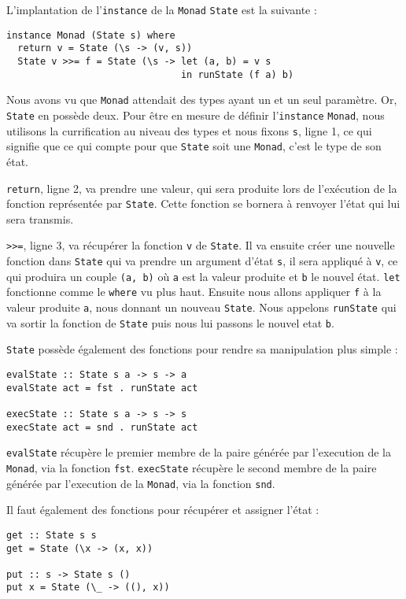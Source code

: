 \documentclass{llncs}
\begin{document}
L'implantation de l'\lstinline{instance} de la \lstinline{Monad} \lstinline{State}
est la suivante :
\begin{lstlisting}
instance Monad (State s) where
  return v = State (\s -> (v, s))
  State v >>= f = State (\s -> let (a, b) = v s
                               in runState (f a) b)
\end{lstlisting}

Nous avons vu que \lstinline{Monad} attendait des types ayant un et un seul paramètre.
Or, \lstinline{State} en possède deux.
Pour être en mesure de définir l'\lstinline{instance} \lstinline{Monad},
nous utilisons la currification au niveau des types et nous fixons \lstinline{s},
ligne 1, ce qui signifie que ce qui compte pour que \lstinline{State} soit une \lstinline{Monad},
c'est le type de son état.

\lstinline{return}, ligne 2, va prendre une valeur, qui sera produite lors de
l'exécution de la fonction représentée par \lstinline{State}.
Cette fonction se bornera à renvoyer l'état qui lui sera transmis.

\lstinline{>>=}, ligne 3, va récupérer la fonction \lstinline{v} de \lstinline{State}.
Il va ensuite créer une nouvelle fonction dans \lstinline{State} qui va prendre
un argument d'état \lstinline{s}, il sera appliqué à \lstinline{v}, ce qui
produira un couple \lstinline{(a, b)} où \lstinline{a} est la valeur produite
et  \lstinline{b} le nouvel état.
\lstinline{let} fonctionne comme le \lstinline{where} vu plus haut.
Ensuite nous allons appliquer \lstinline{f} à la valeur produite \lstinline{a},
nous donnant un nouveau \lstinline{State}.
Nous appelons \lstinline{runState} qui va sortir la fonction de \lstinline{State}
puis nous lui passons le nouvel etat \lstinline{b}.

\lstinline{State} possède également des fonctions pour rendre sa manipulation
plus simple :
\begin{lstlisting}
evalState :: State s a -> s -> a
evalState act = fst . runState act

execState :: State s a -> s -> s
execState act = snd . runState act
\end{lstlisting}
\lstinline{evalState} récupère le premier membre de la paire générée par l'execution
de la \lstinline{Monad}, via la fonction \lstinline{fst}.
\lstinline{execState} récupère le second membre de la paire générée par l'execution
de la \lstinline{Monad}, via la fonction \lstinline{snd}.

Il faut également des fonctions pour récupérer et assigner l'état :
\begin{lstlisting}
get :: State s s
get = State (\x -> (x, x))

put :: s -> State s ()
put x = State (\_ -> ((), x))
\end{lstlisting}
\end{document}
